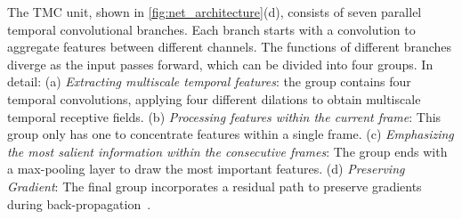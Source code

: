 \documentclass[journal,comsoc]{IEEEtran}
\begin{document}
The TMC unit, shown in \autoref{fig:net_architecture}(d), consists of seven parallel temporal convolutional branches. 
Each branch starts with a  convolution to aggregate features between different channels. 
The functions of different branches diverge as the input passes forward, which can be divided into four groups. 
In detail: (a) \textit{Extracting multiscale temporal features}: the group contains four  temporal convolutions, applying four different dilations to obtain multiscale temporal receptive fields. (b) \textit{Processing features within the current frame}: This group only has one  to concentrate features within a single frame. (c) \textit{Emphasizing the most salient information within the consecutive frames}: The group ends with a  max-pooling layer to draw the most important features. (d) \textit{Preserving Gradient}: The final group incorporates a residual path to preserve gradients during back-propagation~\cite{chen2017dual}. 
\end{document}
